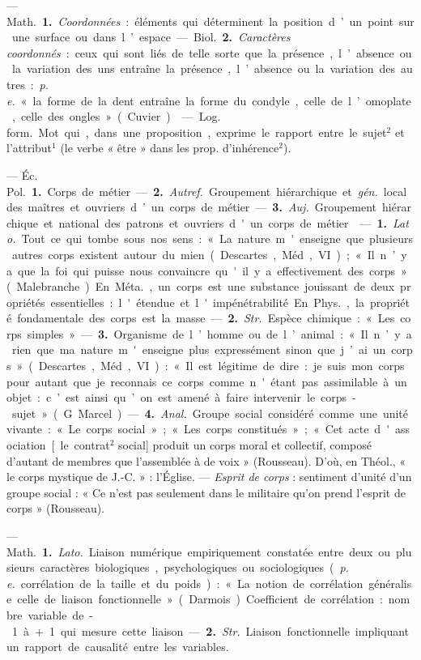 \begin{itemize}[leftmargin=1cm, label=, itemsep=11pt]
 — \si{Math.} {\bf 1.} {\it Coordonnées} :
éléments qui déterminent la position d’un point sur une surface ou
dans l’espace.

— \si{Biol.} {\bf 2.} {\it Caractères coordonnés} :
ceux qui sont liés de telle sorte que
la présence, l’absence ou la variation
des uns entraîne la présence, l’absence ou la variation des autres : {\it p. e.}
« la forme de la dent entraîne la
forme du condyle, celle de l’omoplate, celle des ongles » (Cuvier).

 — \si{Log. form.} Mot qui, dans
une proposition, exprime le rapport
entre le sujet$^2$ et l’attribut$^1$ (le verbe
« être » dans les prop. d’inhérence$^2$).

 — \si{Éc. Pol.} {\bf 1.} Corps de
métier. — {\bf 2.} {\it Autref.} Groupement
hiérarchique et  {\it gén.} local des maîtres et ouvriers d’un corps de métier.
— {\bf 3.}  {\it Auj.} Groupement hiérarchique
et national des patrons et ouvriers
d'un corps de métier.

 — {\bf 1.}  {\it Lato.} Tout ce qui tombe
sous nos sens : « La nature m'enseigne que plusieurs autres corps
existent autour du mien (Descartes,
Méd., VI); « Il n’y a que la foi qui
puisse nous convaincre qu'il y a
effectivement des corps » (Malebranche). En \si{Méta.}, un corps est
une substance jouissant de deux
propriétés essentielles : l'étendue et
l'impénétrabilité. En \si{Phys.}, la propriété fondamentale des corps est la
masse. — {\bf 2.}  {\it Str.} Espèce chimique :
« Les corps simples ».

— {\bf 3.} Organisme de l’homme ou
de l’animal : « Il n’y a rien que ma
nature m'enseigne plus expressément sinon que j’ai un corps » (Descartes, Méd., VI) : « Il est légitime
de dire : je suis mon corps pour
autant que je reconnais ce corps
comme n'étant pas assimilable à
un objet : c’est ainsi qu’on est amené
à faire intervenir le corps-sujet »
(G. Marcel).

— {\bf 4.} {\it Anal.} Groupe social considéré comme une unité vivante : « Le
corps social »; « Les corps constitués »; « Cet acte d'association [le
contrat$^2$ social] produit un corps
moral et collectif, composé d’autant
de membres que l’assemblée à de
voix » (Rousseau). D’où, en Théol.,
« le corps mystique de J.-C. » :
l'Église. — {\it Esprit de corps} : sentiment d'unité d’un groupe social :
« Ce n’est pas seulement dans le militaire qu'on prend l'esprit de corps »
(Rousseau).

 — \si{Math.} {\bf 1.}  {\it Lato.} Liaison
numérique empiriquement constatée
entre deux ou plusieurs caractères
biologiques, psychologiques ou sociologiques ({\it p. e.} corrélation de la taille
et du poids) : « La notion de corrélation généralise celle de liaison
fonctionnelle » (Darmois). Coefficient de corrélation : nombre variable de -1 à +1 qui mesure cette
liaison. — {\bf 2.}  {\it Str.} Liaison fonctionnelle
impliquant un rapport de causalité entre les variables.


\end{itemize}
